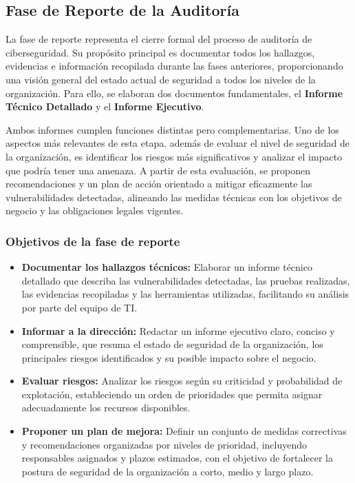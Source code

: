 \documentclass[a4paper, 11pt]{article}
\begin{document}
\clearpage




\subsection{Fase de Reporte de la Auditoría}

La fase de reporte representa el cierre formal del proceso de auditoría de ciberseguridad. 
Su propósito principal es documentar todos los hallazgos, evidencias e información recopilada durante las fases anteriores,
 proporcionando una visión general del estado actual de seguridad a todos los niveles de la organización. Para ello,
 se elaboran dos documentos fundamentales, el \textbf{Informe Técnico Detallado} y el \textbf{Informe Ejecutivo}. 




Ambos informes cumplen funciones distintas pero complementarias. Uno de los aspectos más relevantes de esta etapa. además de evaluar el nivel de seguridad de la organización, 
es identificar los riesgos más significativos y analizar el impacto que podría tener una amenaza. A partir de esta evaluación, se proponen recomendaciones y un plan de acción orientado a mitigar eficazmente las vulnerabilidades detectadas, alineando las medidas técnicas con los objetivos de negocio y las obligaciones legales vigentes.


\subsubsection*{Objetivos de la fase de reporte}
\begin{itemize}
\item \textbf{Documentar los hallazgos técnicos:} Elaborar un informe técnico detallado que describa las vulnerabilidades detectadas, las pruebas realizadas, las evidencias recopiladas y las herramientas utilizadas, facilitando su análisis por parte del equipo de TI.

\item \textbf{Informar a la dirección:} Redactar un informe ejecutivo claro, conciso y comprensible, que resuma el estado de seguridad de la organización, los principales riesgos identificados y su posible impacto sobre el negocio.

\item \textbf{Evaluar riesgos:} Analizar los riesgos según su criticidad y probabilidad de explotación, estableciendo un orden de prioridades que permita asignar adecuadamente los recursos disponibles.

\item \textbf{Proponer un plan de mejora:} Definir un conjunto de medidas correctivas y recomendaciones organizadas por niveles de prioridad, incluyendo responsables asignados y plazos estimados, con el objetivo de fortalecer la postura de seguridad de la organización a corto, medio y largo plazo.
\end{itemize}
\end{document}
